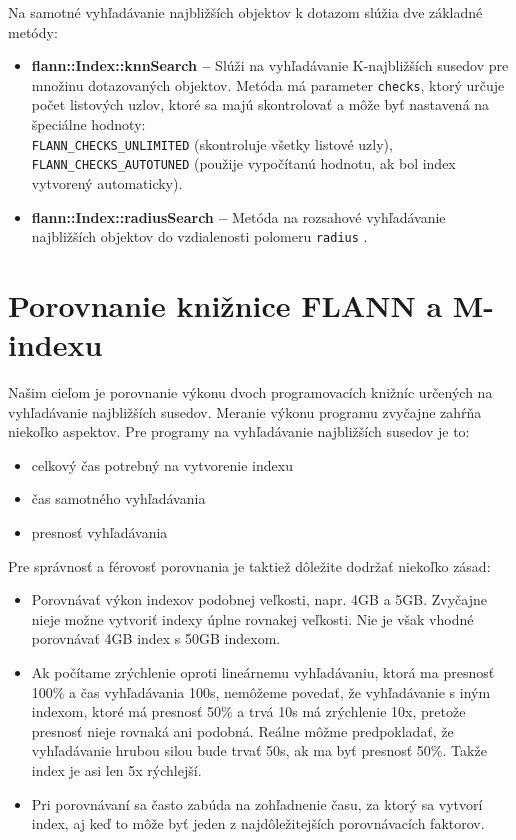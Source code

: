 \documentclass[12pt,a4paper,oneside]{fithesis2}
\begin{document}
Na samotné vyhľadávanie najbližších objektov k dotazom slúžia dve základné metódy:

\begin{itemize}
	\item \textbf{flann::Index::knnSearch --} Slúži na vyhľadávanie K-najbližších susedov pre množinu dotazovaných objektov. Metóda má parameter \texttt{checks}, ktorý určuje počet listových uzlov, ktoré sa majú skontrolovať a môže byť nastavená na špeciálne hodnoty:\\ \texttt{FLANN\_CHECKS\_UNLIMITED} (skontroluje všetky listové uzly),\\ \texttt{FLANN\_CHECKS\_AUTOTUNED} (použije vypočítanú hodnotu, ak bol index vytvorený automaticky).

	\item \textbf{flann::Index::radiusSearch --} Metóda na rozsahové vyhľadávanie najbližších objektov do vzdialenosti polomeru \texttt{radius} \cite{manual}. 

\end{itemize}

		

    \chapter{Porovnanie knižnice FLANN a M-indexu}
    Našim cieľom je porovnanie výkonu dvoch programovacích knižníc určených na vyhľadávanie najbližších susedov. Meranie výkonu programu zvyčajne zahŕňa niekoľko aspektov. Pre programy na vyhľadávanie najbližších susedov je to:
    \begin{itemize}
    \item celkový čas potrebný na vytvorenie indexu
    \item čas samotného vyhľadávania
    \item presnosť vyhľadávania
\end{itemize}   
Pre správnosť a férovosť porovnania je taktiež dôležite dodržať niekoľko zásad:
\begin{itemize}
\item Porovnávať výkon indexov podobnej veľkosti, napr. 4GB a 5GB. Zvyčajne nieje možne vytvoriť indexy úplne rovnakej veľkosti. Nie je však vhodné porovnávať 4GB index s 50GB indexom.

\item Ak počítame zrýchlenie oproti lineárnemu vyhľadávaniu, ktorá ma presnosť 100\% a čas vyhľadávania 100s, nemôžeme povedať, že vyhľadávanie s iným indexom, ktoré má presnosť 50\% a trvá 10s má zrýchlenie 10x, pretože presnosť nieje rovnaká ani podobná. Reálne môžme predpokladať, že vyhľadávanie hrubou silou bude trvať 50s, ak ma byť presnosť 50\%. Takže index je asi len 5x rýchlejší.

\item Pri porovnávaní sa často zabúda na zohľadnenie času, za ktorý sa vytvorí index, aj keď to môže byť jeden z najdôležitejších porovnávacích faktorov.
\end{itemize}
  
\end{document}
